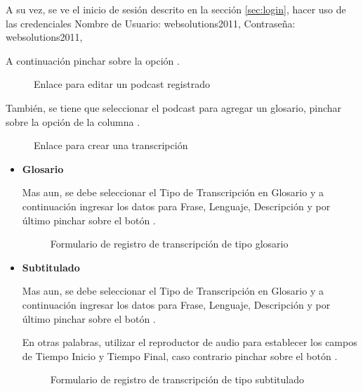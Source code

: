 A su vez, se ve el inicio de sesión descrito en la sección \ref{sec:login}, hacer
uso de las credenciales Nombre de Usuario: websolutions2011, Contraseña: 
websolutions2011,

A continuación pinchar sobre la opción .

\begin{figure}[!ht]
\centering
		\caption{Enlace para editar un podcast registrado}
\end{figure} 

También, se tiene que seleccionar el podcast 
 para agregar un glosario,
pinchar sobre la opción  de la columna
.
 
\begin{figure}[!ht]
\centering
		\caption{Enlace para crear una transcripción}
\end{figure}

\begin{itemize}

\item \textbf{Glosario}

Mas aun, se debe seleccionar el Tipo de Transcripción en Glosario y a continuación
ingresar los datos para Frase, Lenguaje, Descripción y por último pinchar sobre el
botón .
 
\begin{figure}[!ht]
\centering
		\caption{Formulario de registro de transcripción de tipo glosario}
\end{figure}

\item \textbf{Subtitulado}

Mas aun, se debe seleccionar el Tipo de Transcripción en Glosario y a continuación
ingresar los datos para Frase, Lenguaje, Descripción y por último pinchar sobre el
botón .

En otras palabras, utilizar el reproductor de audio para establecer los campos de
Tiempo Inicio y Tiempo Final, caso contrario pinchar sobre el botón 
.

\begin{figure}[!ht]
\centering
		\caption{Formulario de registro de transcripción de tipo subtitulado}
\end{figure}

\end{itemize}

